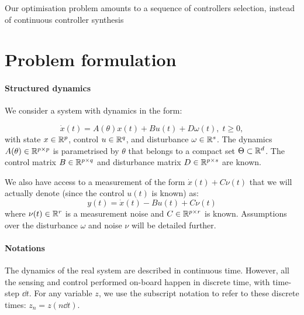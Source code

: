 \documentclass{article}
\begin{document}
    Our optimisation problem amounts to a sequence of controllers selection, instead of continuous controller synthesis

\section{Problem formulation}

\paragraph{Structured dynamics}
We consider a system with dynamics in the form:

\begin{equation}
\label{eq:dynamics}
\dot{x}(t)=A(\theta)x(t) + B u(t) + D \omega(t),\;t\geq0,
\end{equation}
with state $x\in\mathbb{R}^p$, control $u\in\mathbb{R}^q$, and disturbance $\omega\in\mathbb{R}^s$. The dynamics $A(\theta)\in\mathbb{R}^{p\times p}$  is parametrised by $\theta$ that belongs to a compact set $\Theta \subset \mathbb{R}^d$. The control matrix $B\in\mathbb{R}^{p\times q}$ and disturbance matrix $D\in\mathbb{R}^{p\times s}$ are known.

We also have access to a measurement of the form
$
    \dot{x}(t) + C\nu(t)
$
that we will actually denote (since the control $u(t)$ is known) as:
\begin{equation}
\label{eq:measurement}
    y(t) = \dot{x}(t) - Bu(t) + C\nu(t)
\end{equation}
where $\nu(t)\in\mathbb{R}^r$ is a measurement noise and $C\in\mathbb{R}^{p\times r}$ is known. Assumptions over the disturbance $\omega$ and noise $\nu$ will be detailed further.

\paragraph{Notations}

The dynamics of the real system are described in continuous time. However, all the sensing and control performed on-board happen in discrete time, with time-step $\dd t$. For any variable $z$, we use the subscript notation to refer to these discrete times: $z_n = z(n\dd t)$.


\end{document}
